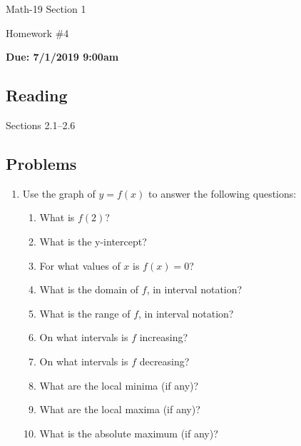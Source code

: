 \documentclass[letterpaper,12pt,fleqn]{article}
\begin{document}
\begin{center}
  \large
  Math-19 Section 1

  \Large
  Homework \#4

  \large
  \textbf{Due: 7/1/2019 9:00am}
\end{center}

\subsection*{Reading}

Sections 2.1--2.6

\subsection*{Problems}

\begin{enumerate}
\item Use the graph of $y=f(x)$ to answer the following questions:


  \begin{enumerate}
  \item What is $f(2)$?
  \item What is the y-intercept?
  \item For what values of $x$ is $f(x)=0$?
  \item What is the domain of $f$, in interval notation?
  \item What is the range of $f$, in interval notation?
  \item On what intervals is $f$ increasing?
  \item On what intervals is $f$ decreasing?
  \item What are the local minima (if any)?
  \item What are the local maxima (if any)?
  \item What is the absolute maximum (if any)?
  \end{enumerate}


\end{enumerate}
\end{document}
